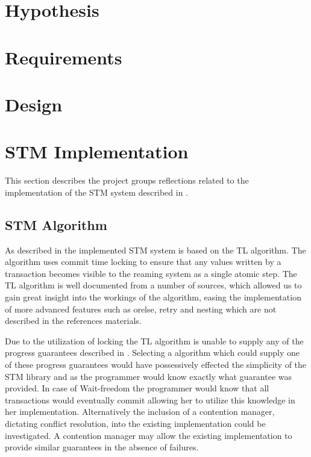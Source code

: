 \section{Hypothesis}
\section{Requirements}
\section{Design}
\section{STM Implementation}
This section describes the project groups reflections related to the implementation of the \ac{STM} system described in .

\subsection{STM Algorithm}
As described in  the implemented \ac{STM} system is based on the TL algorithm\cite{dice2006transactional}. The algorithm uses commit time locking to ensure that any values written by a transaction becomes visible to the reaming system as a single atomic step. The TL algorithm is well documented from a number of sources\cite{dice2006transactional}\cite[p. 438]{herlihy2012art}\cite[p. 106]{harris2010transactional}, which allowed us to gain great insight into the workings of the algorithm, easing the implementation of more advanced features such as orelse, retry and nesting which are not described in the references materials.

Due to the utilization of locking the TL algorithm is unable to supply any of the progress guarantees described in . Selecting a algorithm which could supply one of these progress guarantees would have possessively effected the simplicity of the \ac{STM} library and \stmname as the programmer would know exactly what guarantee was provided. In case of Wait-freedom the programmer would know that all transactions would eventually commit allowing her to utilize this knowledge in her implementation. Alternatively the inclusion of a contention manager, dictating conflict resolution, into the existing implementation could be investigated. A contention manager may allow the existing implementation to provide similar guarantees in the absence of failures.
